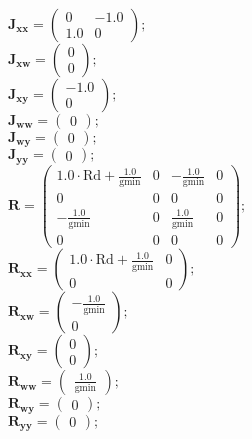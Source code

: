 \documentclass[11pt, oneside]{article}      %
\begin{document}
%
\\
%
$ \mathbf{J_{xx}} = \left(\begin{array}{cc}0 & -1.0\\1.0 & 0\end{array}\right) ; $ 
%
\\
%
$ \mathbf{J_{xw}} = \left(\begin{array}{c}0\\0\end{array}\right) ; $ 
%
\\
%
$ \mathbf{J_{xy}} = \left(\begin{array}{c}-1.0\\0\end{array}\right) ; $ 
%
\\
%
$ \mathbf{J_{ww}} = \left(\begin{array}{c}0\end{array}\right) ; $ 
%
\\
%
$ \mathbf{J_{wy}} = \left(\begin{array}{c}0\end{array}\right) ; $ 
%
\\
%
$ \mathbf{J_{yy}} = \left(\begin{array}{c}0\end{array}\right) ; $ 
%
\\
%
$ \mathbf{R} = \left(\begin{array}{cccc}1.0 \cdot \mathrm{Rd} + \frac{1.0}{\mathrm{gmin}} & 0 & - \frac{1.0}{\mathrm{gmin}} & 0\\0 & 0 & 0 & 0\\- \frac{1.0}{\mathrm{gmin}} & 0 & \frac{1.0}{\mathrm{gmin}} & 0\\0 & 0 & 0 & 0\end{array}\right) ; $ 
%
\\
%
$ \mathbf{R_{xx}} = \left(\begin{array}{cc}1.0 \cdot \mathrm{Rd} + \frac{1.0}{\mathrm{gmin}} & 0\\0 & 0\end{array}\right) ; $ 
%
\\
%
$ \mathbf{R_{xw}} = \left(\begin{array}{c}- \frac{1.0}{\mathrm{gmin}}\\0\end{array}\right) ; $ 
%
\\
%
$ \mathbf{R_{xy}} = \left(\begin{array}{c}0\\0\end{array}\right) ; $ 
%
\\
%
$ \mathbf{R_{ww}} = \left(\begin{array}{c}\frac{1.0}{\mathrm{gmin}}\end{array}\right) ; $ 
%
\\
%
$ \mathbf{R_{wy}} = \left(\begin{array}{c}0\end{array}\right) ; $ 
%
\\
%
$ \mathbf{R_{yy}} = \left(\begin{array}{c}0\end{array}\right) ; $ 
%
\\
%
\end{document}
